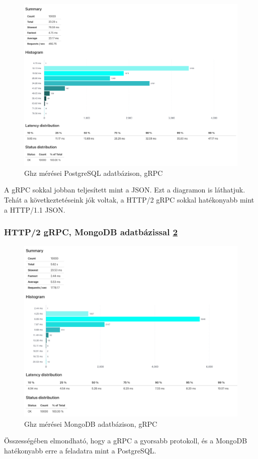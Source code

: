 \begin{figure}[hbt!]
    \centering
    \includegraphics[scale=0.3]{images/ghz-postgres}
    \caption{Ghz mérései PostgreSQL adatbázison, gRPC}
    \label{fig:ghz-postgres}
\end{figure}

\begin{remark}
    A gRPC sokkal jobban teljesített mint a JSON.
    Ezt a diagramon is láthatjuk.
    Tehát a következtetéseink jók voltak, a HTTP/2 gRPC sokkal hatékonyabb mint a HTTP/1.1 JSON.
\end{remark}


\subsubsection{HTTP/2 gRPC, MongoDB adatbázissal \ref{fig:ghz-mongo}}
\begin{figure}[hbt!]
    \centering
    \includegraphics[scale=0.3]{images/ghz-mongo}
    \caption{Ghz mérései MongoDB adatbázison, gRPC}
    \label{fig:ghz-mongo}
\end{figure}

Összességében elmondható, hogy a gRPC a gyorsabb protokoll, és a MongoDB hatékonyabb erre a feladatra mint a PostgreSQL.



